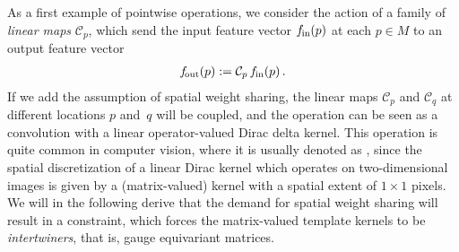 As a first example of pointwise operations, we consider the action of a family of \emph{linear maps} $\mathcal{C}_p$, which send the input feature vector $f_\textup{\;\!\!in}(p)$ at each $p\in M$ to an output feature vector
\begin{align}
    f_\textup{\:\!\!out}(p) := \mathcal{C}_p\, f_\textup{\;\!\!in}(p) \,.
\end{align}
If we add the assumption of spatial weight sharing, the linear maps $\mathcal{C}_p$ and $\mathcal{C}_q$ at different locations $p$ and~$q$ will be coupled, and the operation can be seen as a convolution with a linear operator-valued Dirac delta kernel.
This operation is quite common in computer vision, where it is usually denoted as \onexoneit, since the spatial discretization of a linear Dirac kernel which operates on two-dimensional images is given by a (matrix-valued) kernel with a spatial extent of $1\!\times\!1$ pixels.
We will in the following derive that the demand for spatial weight sharing will result in a constraint, which forces the matrix-valued template kernels to be \emph{intertwiners}, that is, gauge equivariant matrices.


